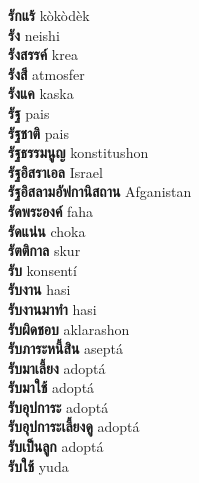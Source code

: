 \textbf{ รักแร้  } kòkòdèk \\
\textbf{ รัง  } neishi \\
\textbf{ รังสรรค์  } krea \\
\textbf{ รังสี  } atmosfer \\
\textbf{ รังแค  } kaska \\
\textbf{ รัฐ  } pais \\
\textbf{ รัฐชาติ  } pais \\
\textbf{ รัฐธรรมนูญ  } konstitushon \\
\textbf{ รัฐอิสราเอล  } Israel \\
\textbf{ รัฐอิสลามอัฟกานิสถาน  } Afganistan \\
\textbf{ รัดพระองค์  } faha \\
\textbf{ รัดแน่น  } choka \\
\textbf{ รัตติกาล  } skur \\
\textbf{ รับ  } konsentí \\
\textbf{ รับงาน  } hasi \\
\textbf{ รับงานมาทำ  } hasi \\
\textbf{ รับผิดชอบ  } aklarashon \\
\textbf{ รับภาระหนี้สิน  } aseptá \\
\textbf{ รับมาเลี้ยง  } adoptá \\
\textbf{ รับมาใช้  } adoptá \\
\textbf{ รับอุปการะ  } adoptá \\
\textbf{ รับอุปการะเลี้ยงดู  } adoptá \\
\textbf{ รับเป็นลูก  } adoptá \\
\textbf{ รับใช้  } yuda \\

